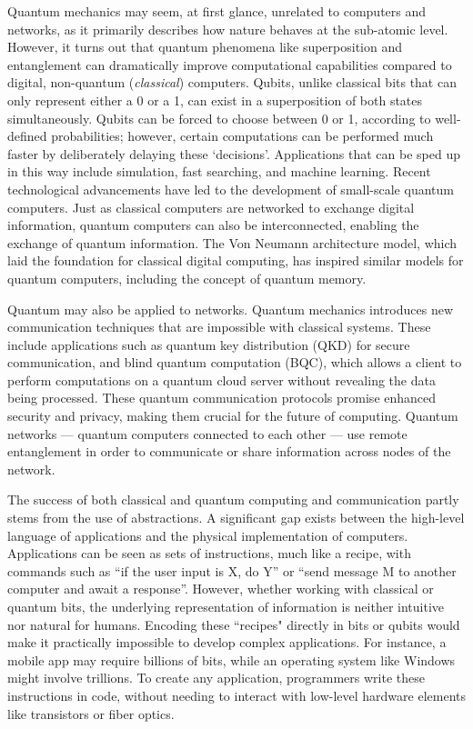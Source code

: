 Quantum mechanics may seem, at first glance, unrelated to computers and networks, as it primarily describes how nature behaves at the sub-atomic level.
However, it turns out that quantum phenomena like superposition and entanglement can dramatically improve computational capabilities compared to digital, non-quantum (\textit{classical}) computers.
Qubits, unlike classical bits that can only represent either a 0 or a 1, can exist in a superposition of both states simultaneously.
Qubits can be forced to choose between 0 or 1, according to well-defined probabilities;
however, certain computations can be performed much faster by deliberately delaying these `decisions'.
Applications that can be sped up in this way include simulation, fast searching, and machine learning.
Recent technological advancements have led to the development of small-scale quantum computers.
Just as classical computers are networked to exchange digital information, quantum computers can also be interconnected, enabling the exchange of quantum information.
The Von Neumann architecture model, which laid the foundation for classical digital computing, has inspired similar models for quantum computers, including the concept of quantum memory.

Quantum may also be applied to networks.
Quantum mechanics introduces new communication techniques that are impossible with classical systems.
These include applications such as quantum key distribution (QKD) for secure communication, and blind quantum computation (BQC), which allows a client to perform computations on a quantum cloud server without revealing the data being processed.
These quantum communication protocols promise enhanced security and privacy, making them crucial for the future of computing.
Quantum networks --- quantum computers connected to each other --- use remote entanglement in order to communicate or share information across nodes of the network.

The success of both classical and quantum computing and communication partly stems from the use of abstractions.
A significant gap exists between the high-level language of applications and the physical implementation of computers.
Applications can be seen as sets of instructions, much like a recipe, with commands such as ``if the user input is X, do Y'' or ``send message M to another computer and await a response''.
However, whether working with classical or quantum bits, the underlying representation of information is neither intuitive nor natural for humans.
Encoding these ``recipes" directly in bits or qubits would make it practically impossible to develop complex applications.
For instance, a mobile app may require billions of bits, while an operating system like Windows might involve trillions.
To create any application, programmers write these instructions in code, without needing to interact with low-level hardware elements like transistors or fiber optics.


